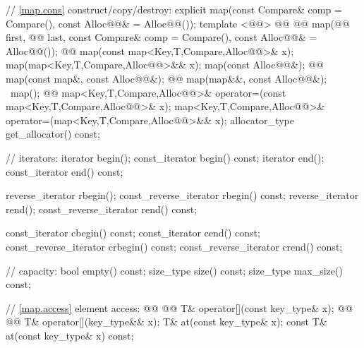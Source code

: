 \documentclass[american,twoside]{book}
\begin{document}
\begin{codeblock}
{{    // \ref{map.cons} construct/copy/destroy:
    explicit map(const Compare& comp = Compare(),
                 const Alloc@@& = Alloc@@());
    template <@@>
      @@
            @@
      map(@@ first, @@ last,
          const Compare& comp = Compare(), const Alloc@@& = Alloc@@());
    @@ 
      map(const map<Key,T,Compare,Alloc@@>& x);
    map(map<Key,T,Compare,Alloc@@>&& x);
    map(const Alloc@@&);
    @@ 
      map(const map&, const Alloc@@&);
    @@
      map(map&&, const Alloc@@&);
   ~map();
    @@
      map<Key,T,Compare,Alloc@@>& operator=(const map<Key,T,Compare,Alloc@@>& x);
    map<Key,T,Compare,Alloc@@>&
      operator=(map<Key,T,Compare,Alloc@@>&& x);
    allocator_type get_allocator() const;

    // iterators:
    iterator               begin();
    const_iterator         begin() const;
    iterator               end();
    const_iterator         end() const;

    reverse_iterator       rbegin();
    const_reverse_iterator rbegin() const;
    reverse_iterator       rend();
    const_reverse_iterator rend() const;

    const_iterator         cbegin() const;
    const_iterator         cend() const;
    const_reverse_iterator crbegin() const;
    const_reverse_iterator crend() const;

    // capacity:
    bool      empty() const;
    size_type size() const;
    size_type max_size() const;

    // \ref{map.access} element access:
    @@
          @@
      T& operator[](const key_type& x);
    @@
          @@
      T& operator[](key_type&& x);
    T&       at(const key_type& x);
    const T& at(const key_type& x) const;

}}
\end{codeblock}
\end{document}
